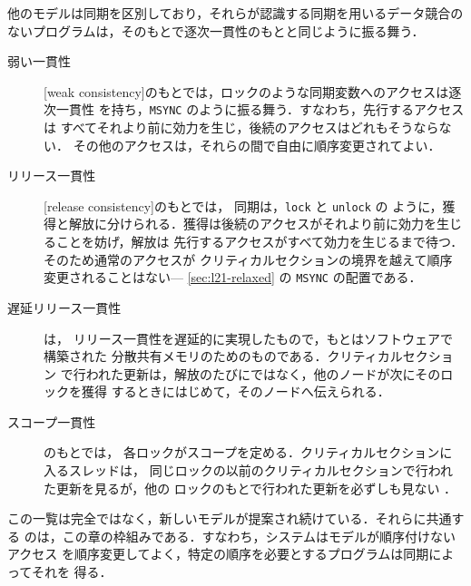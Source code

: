 \documentclass[../main.tex]{subfiles}
\begin{document}
他のモデルは同期を区別しており，それらが認識する同期を用いるデータ競合の
ないプログラムは，そのもとで逐次一貫性のもとと同じように振る舞う．
\begin{description}
  \item[弱い一貫性] [weak
    consistency]のもとでは，ロックのような同期変数へのアクセスは逐次一貫性
    を持ち，\texttt{MSYNC} のように振る舞う．すなわち，先行するアクセスは
    すべてそれより前に効力を生じ，後続のアクセスはどれもそうならない．
    その他のアクセスは，それらの間で自由に順序変更されてよい．
  \item[リリース一貫性] [release
    consistency]のもとでは，    同期は，\texttt{lock} と \texttt{unlock} の
    ように，獲得と解放に分けられる．獲得は後続のアクセスがそれより前に効力を生じることを妨げ，解放は
    先行するアクセスがすべて効力を生じるまで待つ．そのため通常のアクセスが
    クリティカルセクションの境界を越えて順序変更されることはない---
    \cref{sec:l21-relaxed} の \texttt{MSYNC} の配置である．
  \item[遅延リリース一貫性] は，
    リリース一貫性を遅延的に実現したもので，もとはソフトウェアで構築された
    分散共有メモリのためのものである．クリティカルセクション
    で行われた更新は，解放のたびにではなく，他のノードが次にそのロックを獲得
    するときにはじめて，そのノードへ伝えられる．
  \item[スコープ一貫性] のもとでは，
    各ロックがスコープを定める．クリティカルセクションに入るスレッドは，
    同じロックの以前のクリティカルセクションで行われた更新を見るが，他の
    ロックのもとで行われた更新を必ずしも見ない \cite{iftode1996}．
\end{description}
この一覧は完全ではなく，新しいモデルが提案され続けている．それらに共通する
のは，この章の枠組みである．すなわち，システムはモデルが順序付けないアクセス
を順序変更してよく，特定の順序を必要とするプログラムは同期によってそれを
得る．
\end{document}
